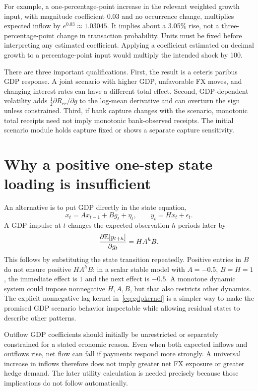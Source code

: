 For example, a one-percentage-point increase in the relevant weighted growth input, with magnitude coefficient $0.03$ and no occurrence change, multiplies expected inflow by $e^{0.03}\approx1.03045$. It implies about a 3.05\% rise, not a three-percentage-point change in transaction probability. Units must be fixed before interpreting any estimated coefficient. Applying a coefficient estimated on decimal growth to a percentage-point input would multiply the intended shock by 100.

There are three important qualifications. First, the result is a ceteris paribus GDP response. A joint scenario with higher GDP, unfavorable FX moves, and changing interest rates can have a different total effect. Second, GDP-dependent volatility adds $\tfrac12\partial R_{rr}/\partial g$ to the log-mean derivative and can overturn the sign unless constrained. Third, if bank capture changes with the scenario, monotonic total receipts need not imply monotonic bank-observed receipts. The initial scenario module holds capture fixed or shows a separate capture sensitivity.

\section{Why a positive one-step state loading is insufficient}
An alternative is to put GDP directly in the state equation,
\begin{equation}
x_t=Ax_{t-1}+Bg_t+\eta_t,\qquad y_t=Hx_t+\epsilon_t.
\end{equation}
A GDP impulse at $t$ changes the expected observation $h$ periods later by
\begin{equation}
\frac{\partial\mathbb E[y_{t+h}]}{\partial g_t}=HA^hB.
\label{eq:impulseresponse}
\end{equation}
This follows by substituting the state transition repeatedly. Positive entries in $B$ do not ensure positive $HA^hB$: in a scalar stable model with $A=-0.5$, $B=H=1$, the immediate effect is $1$ and the next effect is $-0.5$. A monotone dynamic system could impose nonnegative $H,A,B$, but that also restricts other dynamics. The explicit nonnegative lag kernel in~\eqref{eq:gdpkernel} is a simpler way to make the promised GDP scenario behavior inspectable while allowing residual states to describe other patterns.

Outflow GDP coefficients should initially be unrestricted or separately constrained for a stated economic reason. Even when both expected inflows and outflows rise, net flow can fall if payments respond more strongly. A universal increase in inflows therefore does not imply greater net FX exposure or greater hedge demand. The later utility calculation is needed precisely because those implications do not follow automatically.

